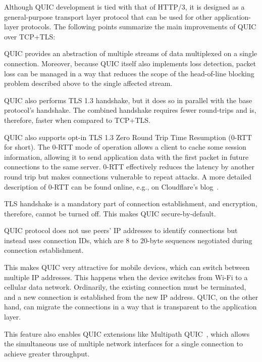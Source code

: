Although QUIC development is tied with that of HTTP/3, it is designed as a general-purpose transport
layer protocol that can be used for other application-layer protocols. The following points
summarize the main improvements of QUIC over TCP+TLS:

\begin{itemize}

     QUIC provides an abstraction of multiple streams of data multiplexed
    on a single connection. Moreover, because QUIC itself also implements loss detection, packet
    loss can be managed in a way that reduces the scope of the head-of-line blocking problem
    described above to the single affected stream.

     QUIC also performs TLS 1.3 handshake, but it does so in
    parallel with the base protocol's handshake. The combined handshake requires fewer round-trips
    and is, therefore, faster when compared to TCP+TLS\@.

    QUIC also supports opt-in TLS 1.3 Zero Round Trip Time Resumption (0-RTT for short). The 0-RTT
    mode of operation allows a client to cache some session information, allowing it to send
    application data with the first packet in future connections to the same server. 0-RTT
    effectively reduces the latency by another round trip but makes connections vulnerable to repeat
    attacks. A more detailed description of 0-RTT can be found online, e.g., on Cloudflare's
    blog~\cite{cloudflare-0rtt}.

     TLS handshake is a mandatory part of connection establishment, and
    encryption, therefore, cannot be turned off. This makes QUIC secure-by-default.

     QUIC protocol does not use peers'
    IP addresses to identify connections but instead uses connection IDs, which are 8 to 20-byte
    sequences negotiated during connection establishment.

    This makes QUIC very attractive for mobile devices, which can switch between multiple IP
    addresses. This happens when the device switches from Wi-Fi to a cellular data network.
    Ordinarily, the existing connection must be terminated, and a new connection is established from
    the new IP address. QUIC, on the other hand, can migrate the connections in a way that is
    transparent to the application layer.

    This feature also enables QUIC extensions like Multipath
    QUIC~\cite{draft-deconinck-quic-multipath-04}, which allows the simultaneous use of multiple
    network interfaces for a single connection to achieve greater throughput.

\end{itemize}

